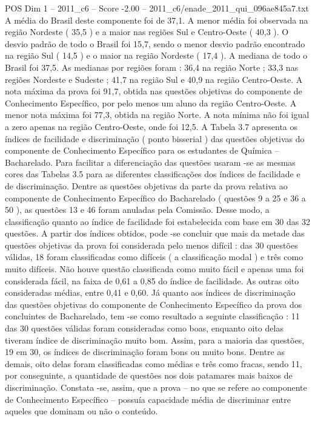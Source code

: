 \begin{textsample}{POS Dim 1 – 2011\_c6 – Score -2.00 – 2011\_c6/enade\_2011\_qui\_096ae845a7.txt}
A média do Brasil deste componente foi de 37,1.
A menor média foi observada na região Nordeste ( 35,5 ) e a maior nas regiões Sul e Centro-Oeste ( 40,3 ).
O desvio padrão de todo o Brasil foi 15,7, sendo o menor desvio padrão encontrado na região Sul ( 14,5 ) e o maior na região Nordeste ( 17,4 ).
A mediana de todo o Brasil foi 37,5.
As medianas por regiões foram : 36,4 na região Norte ; 33,3 nas regiões Nordeste e Sudeste ; 41,7 na região Sul e 40,9 na região Centro-Oeste.
A nota máxima da prova foi 91,7, obtida nas questões objetivas do componente de Conhecimento Específico, por pelo menos um aluno da região Centro-Oeste.
A menor nota máxima foi 77,3, obtida na região Norte.
A nota mínima não foi igual a zero apenas na região Centro-Oeste, onde foi 12,5.
A Tabela 3.7 apresenta os índices de facilidade e discriminação ( ponto bisserial ) das questões objetivas do componente de Conhecimento Específico para os estudantes de Química – Bacharelado.
Para facilitar a diferenciação das questões usaram -se as mesmas cores das Tabelas 3.5 para as diferentes classificações dos índices de facilidade e de discriminação.
Dentre as questões objetivas da parte da prova relativa ao componente de Conhecimento Específico do Bacharelado ( questões 9 a 25 e 36 a 50 ), as questões 13 e 46 foram anuladas pela Comissão.
Desse modo, a classificação quanto ao índice de facilidade foi estabelecida com base em 30 das 32 questões.
A partir dos índices obtidos, pode -se concluir que mais da metade das questões objetivas da prova foi considerada pelo menos difícil : das 30 questões válidas, 18 foram classificadas como difíceis ( a classificação modal ) e três como muito difíceis.
Não houve questão classificada como muito fácil e apenas uma foi considerada fácil, na faixa de 0,61 a 0,85 do índice de facilidade.
As outras oito consideradas médias, entre 0,41 e 0,60.
Já quanto aos índices de discriminação das questões objetivas do componente de Conhecimento Específico da prova dos concluintes de Bacharelado, tem -se como resultado a seguinte classificação : 11 das 30 questões válidas foram consideradas como boas, enquanto oito delas tiveram índice de discriminação muito bom.
Assim, para a maioria das questões, 19 em 30, os índices de discriminação foram bons ou muito bons.
Dentre as demais, oito delas foram classificadas como médias e três como fracas, sendo 11, por conseguinte, a quantidade de questões nos dois patamares mais baixos de discriminação.
Constata -se, assim, que a prova – no que se refere ao componente de Conhecimento Específico – possuía capacidade média de discriminar entre aqueles que dominam ou não o conteúdo.

\end{textsample}
